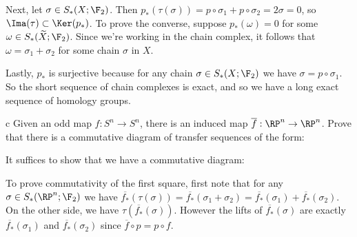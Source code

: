 \documentclass[11pt,letterpaper]{article}
\begin{document}
\begin{solution}
    \quad Next, let $\sigma\in S_*(X; \F_2)$. Then $p_*(\tau(\sigma))=p\circ \sigma_1 + p\circ \sigma_2 = 2\sigma= 0$, so $\Ima(\tau)\subset \Ker(p_*)$. To prove the converse, suppose $p_*(\omega)=0$ for some $\omega\in S_*(\widetilde{X}; \F_2)$. Since we're working in the chain complex, it follows that $\omega=\sigma_1+\sigma_2$ for some chain $\sigma$ in $X$.
    
    \quad Lastly, $p_*$ is surjective because for any chain $\sigma\in S_*(X; \F_2)$ we have $\sigma = p\circ \sigma_1$. So the short sequence of chain complexes is exact, and so we have a long exact sequence of homology groups.

    \begin{partproblem}{c}
        Given an odd map $f : S^n \to S^n$, there is an induced map $\overline{f} : \RP^n \to \RP^n$. Prove that there is a commutative diagram of transfer sequences of the form:
        \begin{center}
        \end{center}
    \end{partproblem}

    \quad It suffices to show that we have a commutative diagram:
    \begin{center}
    \end{center}
    \quad To prove commutativity of the first square, first note that for any $\sigma\in S_*(\RP^n; \F_2)$ we have $\overline{f_*}(\tau(\sigma))=\overline{f_*}(\sigma_1+\sigma_2) = \overline{f_*}(\sigma_1) + \overline{f_*}(\sigma_2)$. On the other side, we have $\tau(\overline{f_*}(\sigma))$. However the lifts of $\overline{f_*}(\sigma)$ are exactly $\overline{f_*}(\sigma_1)$ and $\overline{f_*}(\sigma_2)$ since $\overline{f}\circ p = p\circ f$.


\end{solution}
\end{document}
